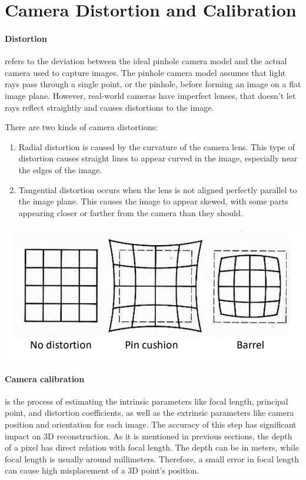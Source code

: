 \documentclass[11pt]{article}
\begin{document}
    \section{Camera Distortion and Calibration}

    \paragraph{Distortion} refers to the deviation between the ideal pinhole camera model and the actual camera
    used to capture images. The pinhole camera model assumes that light rays pass through a single point, or
    the pinhole, before forming an image on a flat image plane. However, real-world cameras have imperfect
    lenses, that doesn't let rays reflect straightly and causes distortions to the image.

    There are two kinds of camera distortions:

    \begin{enumerate}
        \item Radial distortion is caused by the curvature of the camera lens. This type of distortion
        causes straight lines to appear curved in the image, especially near the edges of the image.
        \item Tangential distortion occurs when the lens is not aligned perfectly parallel to the image plane.
        This causes the image to appear skewed, with some parts appearing closer or farther from the camera
        than they should.
    \end{enumerate}
    {\includegraphics[width=\textwidth,height=\textheight,keepaspectratio]{distortion.PNG}}

    \paragraph{Camera calibration} is the process of estimating the intrinsic parameters like focal length,
    principal point, and distortion coefficients, as well as the extrinsic parameters like camera position
    and orientation for each image. The accuracy of this step has significant impact on 3D reconstruction.
    As it is mentioned in previous sections, the depth of a pixel has direct relation with focal length. The depth
    can be in meters, while focal length is usually around millimeters. Therefore, a small error in focal length
    can cause high misplacement of a 3D point's position.
\end{document}

